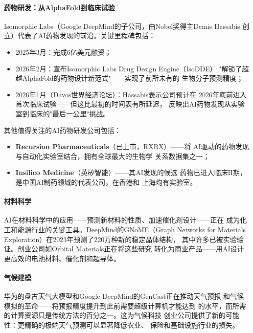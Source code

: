 \paragraph{药物研发：从AlphaFold到临床试验}
Isomorphic Labs（Google DeepMind的子公司，由Nobel奖得主Demis Hassabis
创立）代表了AI药物发现的前沿。关键里程碑包括：
\begin{itemize}
  \item 2025年3月：完成6亿美元融资；
  \item 2026年2月：宣布Isomorphic Labs Drug Design Engine（IsoDDE）
    "解锁了超越AlphaFold的药物设计新范式"——实现了前所未有的
    生物分子预测精度；
  \item 2026年1月（Davos世界经济论坛）：Hassabis表示公司预计在
    2026年底前进入首次临床试验——但这比最初的时间表有所延迟，
    反映出AI药物发现从实验室到临床的"最后一公里"挑战。
\end{itemize}

其他值得关注的AI药物研发公司包括：
\begin{itemize}
  \item \textbf{Recursion Pharmaceuticals}（已上市，RXRX）——将
    AI驱动的药物发现与自动化实验室结合，拥有全球最大的生物学
    关系数据集之一；
  \item \textbf{Insilico Medicine}（英矽智能）——其AI发现的候选
    药物已进入临床II期，是中国AI制药领域的代表公司，在香港和
    上海均有实验室。
\end{itemize}

\paragraph{材料科学}
AI在材料科学中的应用——预测新材料的性质、加速催化剂设计——正在
成为化工和能源行业的关键工具。DeepMind的GNoME（Graph Networks for
Materials Exploration）在2023年预测了220万种新的稳定晶体结构，
其中许多已被实验验证。创业公司如Orbital Materials正在将这些研究
转化为商业产品——用AI设计更高效的电池材料、催化剂和超导体。

\paragraph{气候建模}
华为的盘古天气大模型和Google DeepMind的GenCast正在推动天气预报
和气候模拟的革命——将预报精度提升到此前需要超级计算机才能达到
的水平，而所需的计算资源只是传统方法的百分之一。这为气候科技
创业公司提供了新的可能性：更精确的极端天气预测可以显著降低农业、
保险和基础设施行业的损失。


